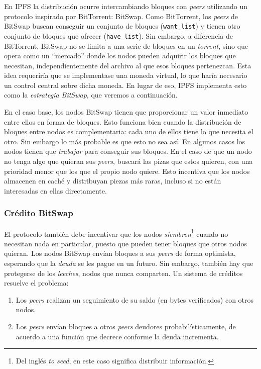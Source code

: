 \documentclass[12pt]{article} %
\begin{document}
En IPFS la distribución ocurre intercambiando bloques con \textit{peers} utilizando un protocolo inspirado por BitTorrent: BitSwap. Como BitTorrent, los \textit{peers} de BitSwap buscan conseguir un conjunto de bloques (\texttt{want\_list}) y tienen otro conjunto de bloques que ofrecer (\texttt{have\_list}). Sin embargo, a diferencia de BitTorrent, BitSwap no se limita a una serie de bloques en un \textit{torrent}, sino que opera como un ``mercado'' donde los nodos pueden adquirir los bloques que necesitan, independientemente del archivo al que esos bloques pertenezcan. Esta idea requeriría que se implementase una moneda virtual, lo que haría necesario un control central sobre dicha moneda. En lugar de eso, IPFS implementa esto como la \textit{estrategia BitSwap}, que veremos a continuación.

En el caso base, los nodos BitSwap tienen que proporcionar un valor inmediato entre ellos en forma de bloques. Esto funciona bien cuando la distribución de bloques entre nodos es complementaria: cada uno de ellos tiene lo que necesita el otro. Sin embargo lo más probable es que esto no sea así. En algunos casos los nodos tienen que \textit{trabajar} para conseguir sus bloques. En el caso de que un nodo no tenga algo que quieran sus \textit{peers}, buscará las pizas que estos quieren, con una prioridad menor que los que el propio nodo quiere. Esto incentiva que los nodos almacenen en caché y distribuyan piezas más raras, incluso si no están interesadas en ellas directamente.

\subsubsection{Crédito BitSwap} %
\label{ssub:crédito_bitswap}

El protocolo también debe incentivar que los nodos \textit{siembren}\footnote{Del inglés \textit{to seed}, en este caso significa distribuir información.} cuando no necesitan nada en particular, puesto que pueden tener bloques que otros nodos quieran. Los nodos BitSwap envían bloques a sus \textit{peers} de forma optimista, esperando que la \textit{deuda} se les pague en un futuro. Sin embargo, también hay que protegerse de los \textit{leeches}, nodos que nunca comparten. Un sistema de créditos resuelve el problema:
\begin{enumerate}
	\item Los \textit{peers} realizan un seguimiento de su saldo (en bytes verificados) con otros nodos.
	\item Los \textit{peers} envían bloques a otros \textit{peers} deudores probabilísticamente, de acuerdo a una función que decrece conforme la deuda incrementa.
\end{enumerate}
\end{document}
